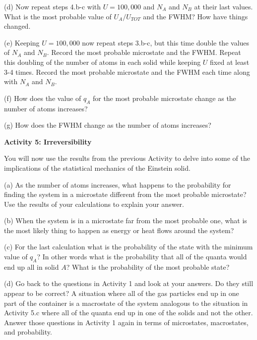 (d) Now repeat steps 4.b-c with $U=100,000$ and $N_A$ and $N_B$ at their last values.
What is the most probable value of $U_A/U_{TOT}$ and the FWHM?
How have things changed.
\vspace{15mm}

(e) Keeping $U=100,000$ now repeat steps 3.b-c, but this time double the values of $N_A$ and $N_B$.
Record the most probable microstate and the FWHM.
Repeat this doubling of the number of atoms in each solid while keeping $U$ fixed at least 3-4 times.
Record the most probable microstate and the FWHM each time along with $N_A$ and $N_B$.
\vspace{45mm}

(f) How does the value of $q_A$ for the most probable microstate change as the number
of atoms increases?
\vspace{15mm}

(g) How does the FWHM change as the number of atoms increases?
\vspace{15mm}

\textbf{Activity 5: Irreversibility}

You will now use the results from the previous Activity to delve into some of the
implications of the statistical mechanics of the Einstein solid.

(a) As the number of atoms increases, what happens to the probability for finding the
system in a microstate different from the most probable microstate?
Use the results of your calculations to explain your answer.
\vspace{15mm}

(b) When the system is in a microstate far from the most probable one, what is the most
likely thing to happen as energy or heat flows around the system?
\vspace{15mm}

(c) For the last calculation what is the probability of the state with the minimum value of $q_A$?
In other words what is the probability that all of the quanta would end up all in solid $A$?
What is the probability of the most probable state?
\vspace{15mm}

(d) Go back to the questions in Activity 1 and look at your answers. 
Do they still appear to be correct?
A situation where all of the gas particles end up in one part of the container is a macrostate
of the system analogous
to the situation in Activity 5.c where all of the quanta end up in one  of the solids and 
not the other.
Answer those questions in Activity 1 again in terms of microstates, macrostates, and probability.

